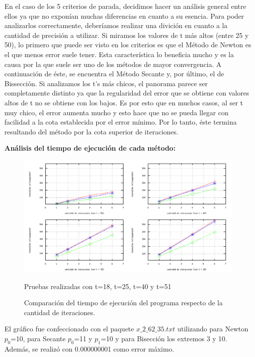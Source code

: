 \documentclass[10pt, a4paper]{article}
\begin{document}
En el caso de los 5 criterios de parada, decidimos hacer un an\'alisis general entre ellos ya que no expon\'ian muchas diferencias en cuanto a su esencia. 
Para poder analizarlos correctamente, deber\'iamos realizar una divici\'on en cuanto a la cantidad de precisi\'on a utilizar. Si miramos los valores de t m\'as altos (entre 25 y 50), lo primero que puede ser visto en los criterios es que el M\'etodo de Newton es el que menos error suele tener. Esta caracter\'istica lo beneficia mucho y es la causa por la que suele ser uno de los m\'etodos de mayor convergencia. A continuaci\'on de \'este, se encuentra el M\'etodo Secante y, por \'ultimo, el de Bissecci\'on.\newline
Si analizamos los t's m\'as chicos, el panorama parece ser completamente distinto ya que la regularidad del error que se obtiene con valores altos de t no se obtiene con los bajos. Es por esto que en muchos casos, al ser t muy chico, el error aumenta mucho y esto hace que no se pueda llegar con facilidad a la cota establecida por el error m\'inimo. Por lo tanto, \'este termina resultando del m\'etodo por la cota superior de iteraciones.\newline

\large{\textbf{An\'alisis del tiempo de ejecuci\'on de cada m\'etodo:}}\newline

\begin{figure}[H] %
\begin{center}
\includegraphics[width=500pt]{./tiempo.png}
\caption[h]{Comparaci\'on del tiempo de ejecuci\'on del programa respecto de la cantidad de iteraciones.}{Pruebas realizadas con t=18, t=25, t=40 y t=51}
\end{center}
\end{figure}

El gr\'afico fue confeccionado con el paquete $x\_2\_62\_35.txt$ utilizando para Newton $p_{0}$=10, para Secante $p_{0}$=11 y $p_{1}$=10 y para Bisecci\'on los extremos 3 y 10. Adem\'as, se realiz\'o con 0.000000001 como error m\'aximo.\newline
\end{document}
